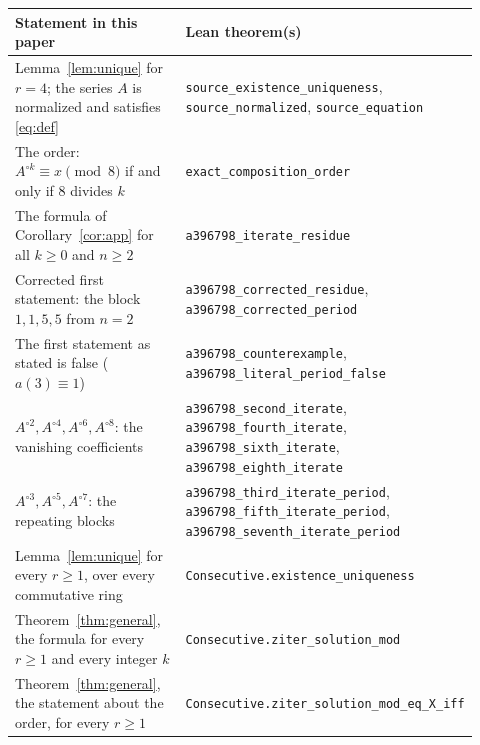 \documentclass[11pt,a4paper]{article}
\theoremstyle{definition}
\theoremstyle{remark}
\begin{document}
\begin{center}\small\renewcommand{\arraystretch}{1.25}
\begin{tabular}{>{\raggedright\arraybackslash}p{0.52\linewidth}>{\raggedright\arraybackslash}p{0.4\linewidth}}
\toprule
Statement in this paper & Lean theorem(s)\\
\midrule
Lemma~\ref{lem:unique} for $r=4$; the series $A$ is normalized and satisfies \eqref{eq:def} & \texttt{source\_\allowbreak{}existence\_\allowbreak{}uniqueness}, \texttt{source\_\allowbreak{}normalized}, \texttt{source\_\allowbreak{}equation} \\
The order: $A^{\circ k}\equiv x\pmod8$ if and only if $8$ divides $k$ & \texttt{exact\_\allowbreak{}composition\_\allowbreak{}order} \\
The formula of Corollary~\ref{cor:app} for all $k\ge0$ and $n\ge2$ & \texttt{a396798\_\allowbreak{}iterate\_\allowbreak{}residue} \\
Corrected first statement: the block $1,1,5,5$ from $n=2$ & \texttt{a396798\_\allowbreak{}corrected\_\allowbreak{}residue}, \texttt{a396798\_\allowbreak{}corrected\_\allowbreak{}period} \\
The first statement as stated is false ($a(3)\equiv1$) & \texttt{a396798\_\allowbreak{}counterexample}, \texttt{a396798\_\allowbreak{}literal\_\allowbreak{}period\_\allowbreak{}false} \\
$A^{\circ2},A^{\circ4},A^{\circ6},A^{\circ8}$: the vanishing coefficients & \texttt{a396798\_\allowbreak{}second\_\allowbreak{}iterate}, \texttt{a396798\_\allowbreak{}fourth\_\allowbreak{}iterate}, \texttt{a396798\_\allowbreak{}sixth\_\allowbreak{}iterate}, \texttt{a396798\_\allowbreak{}eighth\_\allowbreak{}iterate} \\
$A^{\circ3},A^{\circ5},A^{\circ7}$: the repeating blocks & \texttt{a396798\_\allowbreak{}third\_\allowbreak{}iterate\_\allowbreak{}period}, \texttt{a396798\_\allowbreak{}fifth\_\allowbreak{}iterate\_\allowbreak{}period}, \texttt{a396798\_\allowbreak{}seventh\_\allowbreak{}iterate\_\allowbreak{}period} \\
Lemma~\ref{lem:unique} for every $r\ge1$, over every commutative ring & \texttt{Consecutive.existence\_\allowbreak{}uniqueness} \\
Theorem~\ref{thm:general}, the formula for every $r\ge1$ and every integer $k$ & \texttt{Consecutive.ziter\_\allowbreak{}solution\_\allowbreak{}mod} \\
Theorem~\ref{thm:general}, the statement about the order, for every $r\ge1$ & \texttt{Consecutive.ziter\_\allowbreak{}solution\_\allowbreak{}mod\_\allowbreak{}eq\_\allowbreak{}X\_\allowbreak{}iff} \\
\bottomrule
\end{tabular}
\end{center}
\end{document}
